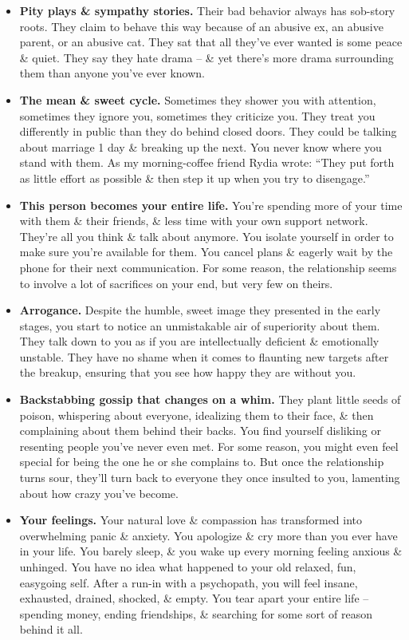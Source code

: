 \documentclass{article}
\numberwithin{equation}{section}
\begin{document}
\begin{itemize}
	\item \textbf{Pity plays \& sympathy stories.} Their bad behavior always has sob-story roots. They claim to behave this way because of an abusive ex, an abusive parent, or an abusive cat. They sat that all they've ever wanted is some peace \& quiet. They say they hate drama -- \& yet there's more drama surrounding them than anyone you've ever known.
	\item \textbf{The mean \& sweet cycle.} Sometimes they shower you with attention, sometimes they ignore you, sometimes they criticize you. They treat you differently in public than they do behind closed doors. They could be talking about marriage 1 day \& breaking up the next. You never know where you stand with them. As my morning-coffee friend Rydia wrote: ``They put forth as little effort as possible \& then step it up when you try to disengage.''
	\item \textbf{This person becomes your entire life.} You're spending more of your time with them \& their friends, \& less time with your own support network. They're all you think \& talk about anymore. You isolate yourself in order to make sure you're available for them. You cancel plans \& eagerly wait by the phone for their next communication. For some reason, the relationship seems to involve a lot of sacrifices on your end, but very few on theirs.
	\item \textbf{Arrogance.} Despite the humble, sweet image they presented in the early stages, you start to notice an unmistakable air of superiority about them. They talk down to you as if you are intellectually deficient \& emotionally unstable. They have no shame when it comes to flaunting new targets after the breakup, ensuring that you see how happy they are without you.
	\item \textbf{Backstabbing gossip that changes on a whim.} They plant little seeds of poison, whispering about everyone, idealizing them to their face, \& then complaining about them behind their backs. You find yourself disliking or resenting people you've never even met. For some reason, you might even feel special for being the one he or she complains to. But once the relationship turns sour, they'll turn back to everyone they once insulted to you, lamenting about how crazy you've become.
	\item \textbf{Your feelings.} Your natural love \& compassion has transformed into overwhelming panic \& anxiety. You apologize \& cry more than you ever have in your life. You barely sleep, \& you wake up every morning feeling anxious \& unhinged. You have no idea what happened to your old relaxed, fun, easygoing self. After a run-in with a psychopath, you will feel insane, exhausted, drained, shocked, \& empty. You tear apart your entire life -- spending money, ending friendships, \& searching for some sort of reason behind it all.
\end{itemize}
\end{document}
